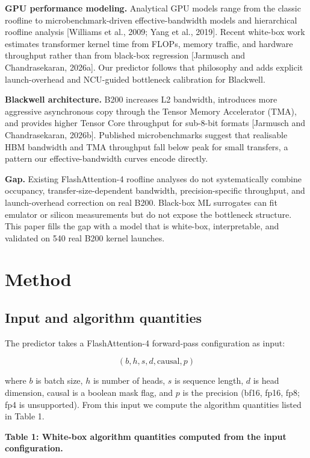 \documentclass[
  11pt,
]{article}
\begin{document}
\textbf{GPU performance modeling.} Analytical GPU models range from the
classic roofline to microbenchmark-driven effective-bandwidth models and
hierarchical roofline analysis {[}Williams et al., 2009; Yang et al.,
2019{]}. Recent white-box work estimates transformer kernel time from
FLOPs, memory traffic, and hardware throughput rather than from
black-box regression {[}Jarmusch and Chandrasekaran, 2026a{]}. Our
predictor follows that philosophy and adds explicit launch-overhead and
NCU-guided bottleneck calibration for Blackwell.

\textbf{Blackwell architecture.} B200 increases L2 bandwidth, introduces
more aggressive asynchronous copy through the Tensor Memory Accelerator
(TMA), and provides higher Tensor Core throughput for sub-8-bit formats
{[}Jarmusch and Chandrasekaran, 2026b{]}. Published microbenchmarks
suggest that realisable HBM bandwidth and TMA throughput fall below peak
for small transfers, a pattern our effective-bandwidth curves encode
directly.

\textbf{Gap.} Existing FlashAttention-4 roofline analyses do not
systematically combine occupancy, transfer-size-dependent bandwidth,
precision-specific throughput, and launch-overhead correction on real
B200. Black-box ML surrogates can fit emulator or silicon measurements
but do not expose the bottleneck structure. This paper fills the gap
with a model that is white-box, interpretable, and validated on 540 real
B200 kernel launches.

\section{Method}\label{method}

\subsection{Input and algorithm
quantities}\label{input-and-algorithm-quantities}

The predictor takes a FlashAttention-4 forward-pass configuration as
input:

\[
(b, h, s, d, \text{causal}, p)
\]

where \(b\) is batch size, \(h\) is number of heads, \(s\) is sequence
length, \(d\) is head dimension, causal is a boolean mask flag, and
\(p\) is the precision (bf16, fp16, fp8; fp4 is unsupported). From this
input we compute the algorithm quantities listed in Table 1.

\textbf{Table 1: White-box algorithm quantities computed from the input
configuration.}
\end{document}
